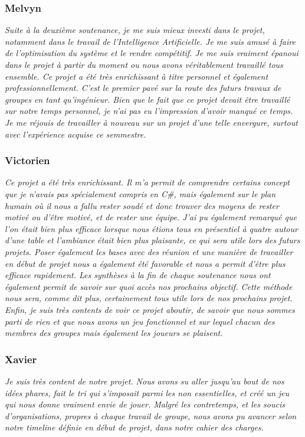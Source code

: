 \documentclass[a4paper,12pt]{article}
\newcommand{\AI}{Intelligence Artificielle}
\begin{document}
        
        \subsubsection{Melvyn}
        \textit{Suite à la deuxième soutenance, je me suis mieux investi dans le projet, notamment dans le travail de l'\AI. Je me suis amusé à faire de l'optimisation du système et le rendre compétitif. Je me suis vraiment épanoui dans le projet à partir du moment ou nous avons véritablement travaillé tous ensemble. Ce projet a été très enrichissant à titre personnel et également professionnellement. C'est le premier pavé sur la route des futurs travaux de groupes en tant qu'ingénieur. Bien que le fait que ce projet devait être travaillé sur notre temps personnel, je n'ai pas eu l'impression d'avoir manqué ce temps. Je me réjouis de travailler à nouveau sur un projet d'une telle envergure, surtout avec l'expérience acquise ce semmestre.}
        
        \subsubsection{Victorien}
             \textit{Ce projet a été très enrichissant. Il m'a permit de comprendre certains concept que je n'avais pas spécialement compris en C\#, mais également sur le plan humain où il nous a fallu rester soudé et donc trouver des moyens de rester motivé ou d'être motivé, et de rester une équipe. J'ai pu également remarqué que l'on était bien plus efficace lorsque nous étions tous en présentiel à quatre autour d'une table et l'ambiance était bien plus plaisante, ce qui sera utile lors des futurs projets. Poser également les bases avec des réunion et une manière de travailler en début de projet nous a également été favorable et nous a permit d'être plus efficace rapidement. Les synthèses à la fin de chaque soutenance nous ont également permit de savoir sur quoi accès nos prochains objectif. Cette méthode nous sera, comme dit plus, certainement tous utile lors de nos prochains projet. Enfin, je suis très contents de voir ce projet aboutir, de savoir que nous sommes parti de rien et que nous avons un jeu fonctionnel et sur lequel chacun des membres des groupes mais également les joueurs se plaisent.}
        
        \subsubsection{Xavier}
             \textit{Je suis très content de notre projet. Nous avons su aller jusqu'au bout de nos idées phares, fait le tri qui s'imposait parmi les non essentielles, et créé un jeu qui nous donne vraiment envie de jouer. Malgré les contretemps, et les soucis d'organisations, propres à chaque travail de groupe, nous avons pu avancer selon notre timeline définie en début de projet, dans notre cahier des charges.}
        
\end{document}
